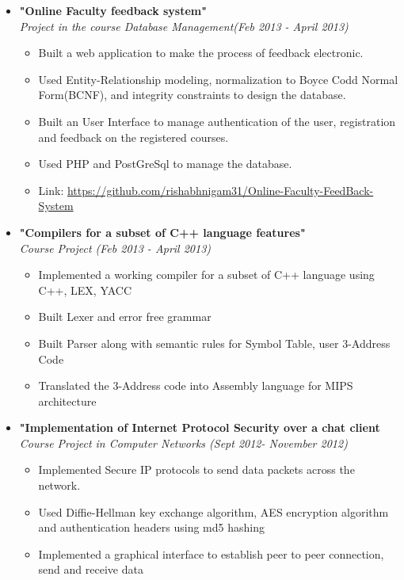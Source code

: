 \documentclass[margin,line]{resume}
\begin{document}
\begin{resume}
\begin{itemize}
  \item \large{\textbf{\textsf{"Online Faculty feedback system"}}}
    \\ \small{\textit{Project in the course Database Management(Feb 2013 - April 2013)}}
    \normalsize
    \begin{itemize}
    \item Built a web application to make the process of feedback electronic.
    \item Used Entity-Relationship modeling, normalization to Boyce Codd Normal Form(BCNF), and integrity constraints to design the database.
    \item Built an User Interface to manage authentication of the user, registration and feedback on the registered courses.
    \item Used PHP and PostGreSql to manage the database.
    \item Link: \url{https://github.com/rishabhnigam31/Online-Faculty-FeedBack-System}
    \end{itemize}
    \newpage
  \item \large{\textbf{\textsf{"Compilers for a subset of C++ language features"}}}
    \\ \small{\textit{Course Project (Feb 2013 - April 2013)}}
    \normalsize
    \begin{itemize}
    \item Implemented a working compiler for a subset of C++ language using C++, LEX, YACC
    \item Built Lexer and error free grammar
    \item Built Parser along with semantic rules for Symbol Table, user 3-Address Code
    \item Translated the 3-Address code into Assembly language for MIPS architecture
    \end{itemize}

  \item \large{\textbf{\textsf{"Implementation of Internet Protocol Security over a chat client}}}
    \\ \small{\textit{Course Project in Computer Networks (Sept 2012- November 2012)}}
    \normalsize
    \begin{itemize}
    \item Implemented Secure IP protocols to send data packets across the network.
    \item Used Diffie-Hellman key exchange algorithm, AES encryption algorithm and authentication headers using md5 hashing
    \item Implemented a graphical interface to establish peer to peer connection, send and receive data
    \end{itemize}


\end{itemize}
\end{resume}
\end{document}
